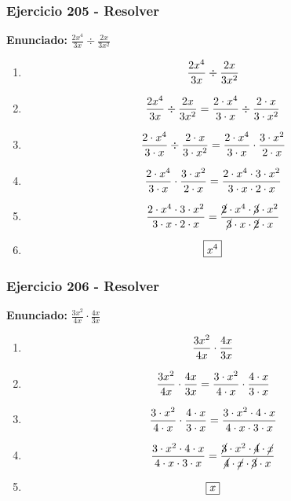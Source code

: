 \documentclass[11pt,a4paper]{article}
\newcommand{\fitmath}[1]{%
\[
\setbox0=\hbox{$\displaystyle #1$}%
\ifdim\wd0>\linewidth
\resizebox{\linewidth}{!}{$\displaystyle #1$}%
\else
#1%
\fi
\]
}
\begin{document}
\vspace{0.12cm}
\subsubsection*{Ejercicio 205 - Resolver}
\textbf{Enunciado:} $ \frac{2 x^{4}}{3 x} \div \frac{2 x}{3 x^{2}} $\par
\begin{enumerate}[leftmargin=2em]
\item \fitmath{\frac{2 x^{4}}{3 x} \div \frac{2 x}{3 x^{2}}}
\item \fitmath{\frac{2 x^{4}}{3 x} \div \frac{2 x}{3 x^{2}}= \frac{2\cdot x^{4}}{3\cdot x} \div \frac{2\cdot x}{3\cdot x^{2}}}
\item \fitmath{\frac{2\cdot x^{4}}{3\cdot x}\div \frac{2\cdot x}{3\cdot x^{2}}= \frac{2\cdot x^{4}}{3\cdot x}\cdot \frac{3\cdot x^{2}}{2\cdot x}}
\item \fitmath{\frac{2\cdot x^{4}}{3\cdot x}\cdot \frac{3\cdot x^{2}}{2\cdot x}= \frac{2\cdot x^{4}\cdot 3\cdot x^{2}}{3\cdot x\cdot 2\cdot x}}
\item \fitmath{\frac{2\cdot x^{4}\cdot 3\cdot x^{2}}{3\cdot x\cdot 2\cdot x}= \frac{\cancel{2}\cdot x^{4}\cdot \cancel{3}\cdot x^{2}}{\cancel{3}\cdot x\cdot \cancel{2}\cdot x}}
\item \fitmath{\boxed{x^{4}}}
\end{enumerate}

\vspace{0.12cm}
\subsubsection*{Ejercicio 206 - Resolver}
\textbf{Enunciado:} $ \frac{3 x^{2}}{4 x} \cdot \frac{4 x}{3 x} $\par
\begin{enumerate}[leftmargin=2em]
\item \fitmath{\frac{3 x^{2}}{4 x} \cdot \frac{4 x}{3 x}}
\item \fitmath{\frac{3 x^{2}}{4 x} \cdot \frac{4 x}{3 x}= \frac{3\cdot x^{2}}{4\cdot x} \cdot \frac{4\cdot x}{3\cdot x}}
\item \fitmath{\frac{3\cdot x^{2}}{4\cdot x}\cdot \frac{4\cdot x}{3\cdot x}= \frac{3\cdot x^{2}\cdot 4\cdot x}{4\cdot x\cdot 3\cdot x}}
\item \fitmath{\frac{3\cdot x^{2}\cdot 4\cdot x}{4\cdot x\cdot 3\cdot x}= \frac{\cancel{3}\cdot x^{2}\cdot \cancel{4}\cdot \cancel{x}}{\cancel{4}\cdot \cancel{x}\cdot \cancel{3}\cdot x}}
\item \fitmath{\boxed{x}}
\end{enumerate}
\end{document}
